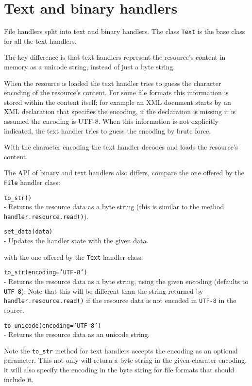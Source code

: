 \section{Text and binary handlers}

File handlers split into text and binary handlers. The class {\tt Text}
is the base class for all the text handlers.

The key difference is that text handlers represent the resource's content
in memory as a unicode string, instead of just a byte string.

When the resource is loaded the text handler tries to guess the character
encoding of the resource's content. For some file formats this information
is stored within the content itself; for example an XML document starts
by an XML declaration that specifies the encoding, if the declaration is
missing it is assumed the encoding is UTF-8. When this information is not
explicitly indicated, the text handler tries to guess the encoding by
brute force.

With the character encoding the text handler decodes and loads the resource's
content.

The API of binary and text handlers also differs, compare the one offered
by the {\tt File} handler class:

\begin{api}
  {\tt to\_str()}\\
  - Returns the resource data as a byte string (this is similar to the
    method {\tt handler.resource.read()}).

  {\tt set\_data(data)}\\
  - Updates the handler state with the given data.
\end{api}

with the one offered by the {\tt Text} handler class:

\begin{api}
  {\tt to\_str(encoding='UTF-8')}\\
  - Returns the resource data as a byte string, using the given encoding
  (defaults to {\tt UTF-8}). Note that this will be different than the
  string returned by {\tt handler.resource.read()} if the resource
  data is not encoded in {\tt UTF-8} in the source.

  {\tt to\_unicode(encoding='UTF-8')}\\
  - Returns the resource data as an unicode string.
\end{api}

Note the {\tt to\_str} method for text handlers accepts the encoding as
an optional parameter. This not only will return a byte string in the
given charater encoding, it will also specify the encoding in the byte
string for file formats that should include it.

